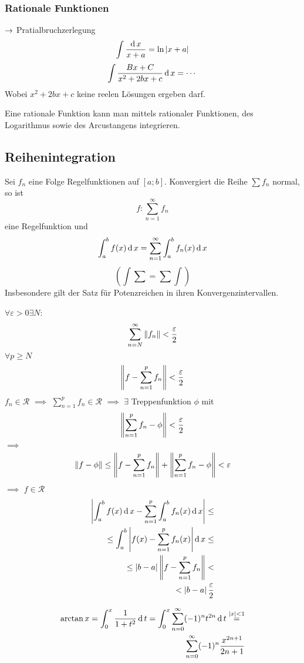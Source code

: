 \subsubsection{Rationale Funktionen}
$\rightarrow$ Pratialbruchzerlegung
\[\int\frac{\operatorname{d} x}{x+a}=\ln\left| x+a \right|\]
\[\int\frac{Bx+C}{x^2+2bx+c}\operatorname{d} x=\cdots\]
Wobei $x^2+2bx+c$ keine reelen Lösungen ergeben darf.
\begin{Sat}
  Eine rationale Funktion kann man mittels rationaler Funktionen, des Logarithmus sowie des Arcustangens integrieren.
\end{Sat}
\subsection{Reihenintegration}
\begin{Sat}
  Sei $f_n$ eine Folge Regelfunktionen auf $[a;b]$. Konvergiert die Reihe $\sum f_n$ normal, so ist 
  \[f:\sum^\infty_{n=1}f_n\]
  eine Regelfunktion und
  \[\int^b_af(x)\operatorname{d} x=\sum^\infty_{n=1}\int^b_af_n(x)\operatorname{d} x\]
  \[(\int\sum = \sum\int)\]
  Insbesondere gilt der Satz für Potenzreichen in ihren Konvergenzintervallen.
\end{Sat}
\begin{Bew}
  $\forall\varepsilon >0 \exists N$:
  \begin{align*}
    \sum^\infty_{n=N}\left\| f_n \right\|<\frac{\varepsilon}{2}
  \end{align*}
  $\forall p\geq N$
  \begin{align*}
    \left\| f-\sum^p_{n=1}f_n \right\|<\frac{\varepsilon}{2}
  \end{align*}
  $f_n\in\mathcal{R}$ $\implies$ $\sum^p_{n=1}f_n\in\mathcal{R}$ $\implies$ $\exists$ Treppenfunktion $\phi$ mit
 \begin{align*}
   \left\| \sum^p_{n=1}f_n-\phi \right\|<\frac{\varepsilon}{2}
 \end{align*}
 $\implies$
 \begin{align*}
   \left\| f-\phi \right\|\leq \left\| f-\sum^p_{n=1}f_n \right\|+\left\| \sum^p_{n=1}f_n-\phi \right\|<\varepsilon
 \end{align*}
 $\implies$ $f\in \mathcal{R}$
 \begin{align*}
   \left| \int_a^bf(x)\operatorname{d} x-\sum^p_{n=1}\int^b_af_n(x)\operatorname{d} x \right|\leq\\
   \leq \int^b_a\left| f(x)-\sum^p_{n=1}f_n(x) \right|\operatorname{d} x\leq \\
   \leq \left| b-a \right|\left\| f-\sum^p_{n=1}f_n \right\|<\\
   < \left| b-a \right|\frac{\varepsilon}{2}
 \end{align*}
\end{Bew}
\begin{Bsp}
  \begin{align*}
    \arctan x= \int^x_0\frac{1}{1+t^2}\operatorname{d} t=\int^x_0\sum^\infty_{n=0}(-1)^nt^{2n}\operatorname{d} t\stackrel{\left| x \right|<1}{=}\\
    \sum^\infty_{n=0}(-1)^n\frac{x^{2n+1}}{2n+1}
  \end{align*}
\end{Bsp}
